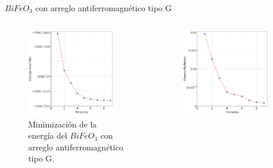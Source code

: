 \begin{frame}{$BiFeO_{3}$ con arreglo antiferromagn\'etico tipo G}
    \begin{columns}[t]
        \begin{figure}[H]
            \centering
            \includegraphics[width=0.9\textwidth]{contenido/resultados/img_resultados/energia_BFO_G.png}
            \caption{Minimizaci\'on de la energ\'ia del $BiFeO_{3}$ con arreglo 
                antiferromagn\'etico tipo G.}
        \end{figure}
        \begin{figure}[H]
            \centering
            \includegraphics[width=0.9\textwidth]{contenido/resultados/img_resultados/fuerza_BFO_G.png}

\end{figure}
\end{columns}
\end{frame}
